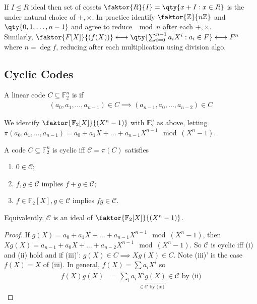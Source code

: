 If $I \trianglelefteq R$ ideal then set of cosets $\faktor{R}{I} = \qty{x + I : x \in R}$ is the  under natural choice of $+, \times$.
In practice identify $\faktor{\mathbb{Z}}{n \mathbb{Z}}$ and $\qty{0, 1, \dots, n-1}$ and agree to reduce $\mod n$ after each $+, \times$. \\
Similarly, $\faktor{F[X]}{(f(X))} \longleftrightarrow \qty{\sum_{i=0}^{n-1} a_i X^i : a_i \in F} \longleftrightarrow F^n$ where $n = \deg f$, reducing after each multiplication using division algo.


\subsection{Cyclic Codes}

\begin{definition}
    A linear code $C \subseteq \mathbb F_2^n$ is  if
    \begin{align*}
        (a_0, a_1, \dots, a_{n-1}) \in C \implies (a_{n-1}, a_0, \dots, a_{n-2}) \in C
    \end{align*}
\end{definition}

We identify $\faktor{\mathbb F_2[X]}{(X^n - 1)}$ with $\mathbb F_2^n$ as above, letting $\pi(a_0, a_1, \dots, a_{n-1}) = a_0 + a_1X + \dots + a_{n-1}X^{n-1} \mod (X^n - 1)$.

\begin{lemma}
    A code $C \subseteq \mathbb F_2^n$ is cyclic iff $\mathcal C = \pi(C)$ satisfies
    \begin{enumerate}
        \item $0 \in \mathcal C$;
        \item $f, g \in \mathcal C$ implies $f + g \in \mathcal C$;
        \item $f \in \mathbb F_2[X], g \in \mathcal C$ implies $fg \in \mathcal C$.
    \end{enumerate}
\end{lemma}

Equivalently, $\mathcal C$ is an ideal of $\faktor{\mathbb F_2[X]}{(X^n - 1)}$.

\begin{proof}
    If $g(X) = a_0 + a_1X + \dots + a_{n-1}X^{n-1} \mod (X^n - 1)$, then $Xg(X) = a_{n-1} + a_0X + \dots + a_{n-2}X^{n-1} \mod (X^n - 1)$.
    So $\mathcal C$ is cyclic iff (i) and (ii) hold and if (iii)': $g(X) \in C \implies Xg(X) \in C$.
    Note (iii)' is the case $f(X) = X$ of (iii).
    In general, $f(X) = \sum a_i X^i$ so
    \begin{align*}
        f(X) g(X) &= \sum_i a_i \underbracket{X^i g(X)}_{\in \mathcal{C} \text{ by (iii)}} \in \mathcal{C} \text{ by (ii)}
    \end{align*}
\end{proof}

